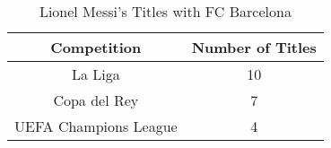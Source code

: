 \begin{table}[ht!]
    \centering
    \caption{Lionel Messi's Titles with FC Barcelona}
    \begin{tabular}{|c|c|}
    \hline
    \textbf{Competition} & \textbf{Number of Titles} \\ \hline
    La Liga & 10 \\ \hline
    Copa del Rey & 7 \\ \hline
    UEFA Champions League & 4  \\ \hline
    \end{tabular}
    \label{tab:messi_barca_titles} 
\end{table}
    